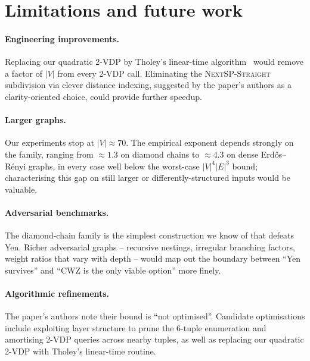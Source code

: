 \section{Limitations and future work}

\paragraph{Engineering improvements.} Replacing our quadratic 2-VDP by
Tholey's linear-time algorithm~\cite{Tholey2012} would remove a factor
of $|V|$ from every 2-VDP call. Eliminating the
\textsc{NextSP-Straight} subdivision via clever distance indexing,
suggested by the paper's authors as a clarity-oriented choice, could
provide further speedup.

\paragraph{Larger graphs.} Our experiments stop at $|V|\approx 70$. The
empirical exponent depends strongly on the family, ranging from
$\approx 1.3$ on diamond chains to $\approx 4.3$ on dense
Erd\H{o}s--R\'enyi graphs, in every case well below the worst-case
$|V|^{4}|E|^{3}$ bound; characterising this gap on still larger or
differently-structured inputs would be valuable.

\paragraph{Adversarial benchmarks.} The diamond-chain family is the
simplest construction we know of that defeats Yen. Richer adversarial
graphs -- recursive nestings, irregular branching factors, weight
ratios that vary with depth -- would map out the boundary between
``Yen survives'' and ``CWZ is the only viable option'' more finely.

\paragraph{Algorithmic refinements.} The paper's authors note their
bound is ``not optimised''. Candidate optimisations include exploiting
layer structure to prune the $6$-tuple enumeration and amortising 2-VDP
queries across nearby tuples, as well as replacing our quadratic 2-VDP
with Tholey's linear-time routine.
